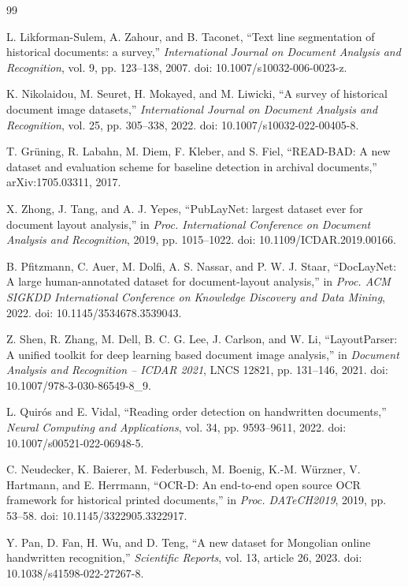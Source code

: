 \documentclass[12pt]{article}
\begin{document}
\begin{thebibliography}{99}

L. Likforman-Sulem, A. Zahour, and B. Taconet, ``Text line segmentation of historical documents: a survey,'' \emph{International Journal on Document Analysis and Recognition}, vol. 9, pp. 123--138, 2007. doi: 10.1007/s10032-006-0023-z.

K. Nikolaidou, M. Seuret, H. Mokayed, and M. Liwicki, ``A survey of historical document image datasets,'' \emph{International Journal on Document Analysis and Recognition}, vol. 25, pp. 305--338, 2022. doi: 10.1007/s10032-022-00405-8.

T. Gr\"uning, R. Labahn, M. Diem, F. Kleber, and S. Fiel, ``READ-BAD: A new dataset and evaluation scheme for baseline detection in archival documents,'' arXiv:1705.03311, 2017.

X. Zhong, J. Tang, and A. J. Yepes, ``PubLayNet: largest dataset ever for document layout analysis,'' in \emph{Proc. International Conference on Document Analysis and Recognition}, 2019, pp. 1015--1022. doi: 10.1109/ICDAR.2019.00166.

B. Pfitzmann, C. Auer, M. Dolfi, A. S. Nassar, and P. W. J. Staar, ``DocLayNet: A large human-annotated dataset for document-layout analysis,'' in \emph{Proc. ACM SIGKDD International Conference on Knowledge Discovery and Data Mining}, 2022. doi: 10.1145/3534678.3539043.

Z. Shen, R. Zhang, M. Dell, B. C. G. Lee, J. Carlson, and W. Li, ``LayoutParser: A unified toolkit for deep learning based document image analysis,'' in \emph{Document Analysis and Recognition -- ICDAR 2021}, LNCS 12821, pp. 131--146, 2021. doi: 10.1007/978-3-030-86549-8\_9.

L. Quir\'os and E. Vidal, ``Reading order detection on handwritten documents,'' \emph{Neural Computing and Applications}, vol. 34, pp. 9593--9611, 2022. doi: 10.1007/s00521-022-06948-5.

C. Neudecker, K. Baierer, M. Federbusch, M. Boenig, K.-M. W\"urzner, V. Hartmann, and E. Herrmann, ``OCR-D: An end-to-end open source OCR framework for historical printed documents,'' in \emph{Proc. DATeCH2019}, 2019, pp. 53--58. doi: 10.1145/3322905.3322917.


Y. Pan, D. Fan, H. Wu, and D. Teng, ``A new dataset for Mongolian online handwritten recognition,'' \emph{Scientific Reports}, vol. 13, article 26, 2023. doi: 10.1038/s41598-022-27267-8.


\end{thebibliography}
\end{document}
